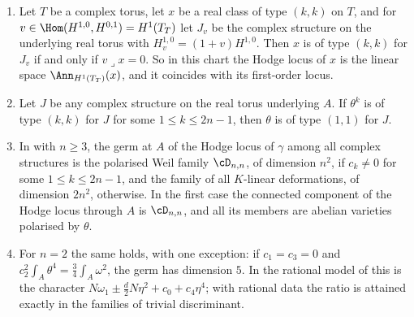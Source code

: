 \begin{proposition}
\label{prop:p2primelocus}
\begin{enumerate}[label=\textup{(\roman*)},leftmargin=2.6em,itemsep=2pt]
\item Let $T$ be a complex torus, let $x$ be a real class of type $(k,k)$ on
  $T$, and for $v\in\Hom(H^{1,0},H^{0,1})=H^{1}(T_{T})$ let $J_{v}$ be the
  complex structure on the underlying real torus with $H^{1,0}_{v}=(1+v)H^{1,0}$.
  Then $x$ is of type $(k,k)$ for $J_{v}$ if and only if $v\lrcorner x=0$. So
  in this chart the Hodge locus of $x$ is the linear space
  $\Ann_{H^{1}(T_{T})}(x)$, and it coincides with its first-order locus.
\item Let $J$ be any complex structure on the real torus underlying $A$. If
  $\theta^{k}$ is of type $(k,k)$ for $J$ for some $1\le k\le2n-1$, then
  $\theta$ is of type $(1,1)$ for $J$.
\item In  with $n\ge3$, the germ at $A$ of the Hodge locus
  of $\gamma$ among all complex structures is the polarised Weil family
  $\cD_{n,n}$, of dimension $n^{2}$, if $c_{k}\ne0$ for some $1\le k\le2n-1$,
  and the family of all $K$-linear deformations, of dimension $2n^{2}$,
  otherwise. In the first case the connected component of the Hodge locus
  through $A$ is $\cD_{n,n}$, and all its members are abelian varieties
  polarised by $\theta$.
\item For $n=2$ the same holds, with one exception: if $c_{1}=c_{3}=0$ and
  $c_{2}^{2}\int_{A}\theta^{4}=\tfrac34\int_{A}\omega^{2}$, the germ has
  dimension $5$. In the rational model of \cite{BMB26} this is
  the character $N\omega_{1}\pm\tfrac{d}{2}N\eta^{2}+c_{0}+c_{4}\eta^{4}$;
  with rational data the ratio is attained exactly in the families of trivial
  discriminant.
\end{enumerate}
\end{proposition}

